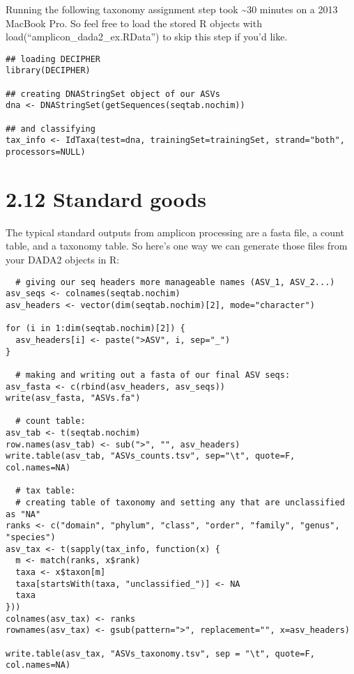 \documentclass[
]{book}
\begin{document}
Running the following taxonomy assignment step took \textasciitilde30 minutes on a 2013 MacBook Pro. So feel free to load the stored R objects with load(``amplicon\_dada2\_ex.RData'') to skip this step if you'd like.

\begin{verbatim}
## loading DECIPHER
library(DECIPHER)

## creating DNAStringSet object of our ASVs
dna <- DNAStringSet(getSequences(seqtab.nochim))

## and classifying
tax_info <- IdTaxa(test=dna, trainingSet=trainingSet, strand="both", processors=NULL)
\end{verbatim}

\hypertarget{standard-goods}{%
\section{2.12 Standard goods}\label{standard-goods}}

The typical standard outputs from amplicon processing are a fasta file, a count table, and a taxonomy table. So here's one way we can generate those files from your DADA2 objects in R:

\begin{verbatim}
  # giving our seq headers more manageable names (ASV_1, ASV_2...)
asv_seqs <- colnames(seqtab.nochim)
asv_headers <- vector(dim(seqtab.nochim)[2], mode="character")

for (i in 1:dim(seqtab.nochim)[2]) {
  asv_headers[i] <- paste(">ASV", i, sep="_")
}

  # making and writing out a fasta of our final ASV seqs:
asv_fasta <- c(rbind(asv_headers, asv_seqs))
write(asv_fasta, "ASVs.fa")

  # count table:
asv_tab <- t(seqtab.nochim)
row.names(asv_tab) <- sub(">", "", asv_headers)
write.table(asv_tab, "ASVs_counts.tsv", sep="\t", quote=F, col.names=NA)

  # tax table:
  # creating table of taxonomy and setting any that are unclassified as "NA"
ranks <- c("domain", "phylum", "class", "order", "family", "genus", "species")
asv_tax <- t(sapply(tax_info, function(x) {
  m <- match(ranks, x$rank)
  taxa <- x$taxon[m]
  taxa[startsWith(taxa, "unclassified_")] <- NA
  taxa
}))
colnames(asv_tax) <- ranks
rownames(asv_tax) <- gsub(pattern=">", replacement="", x=asv_headers)

write.table(asv_tax, "ASVs_taxonomy.tsv", sep = "\t", quote=F, col.names=NA)
\end{verbatim}
\end{document}

